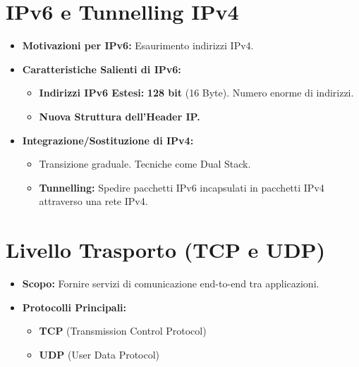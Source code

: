 \section{IPv6 e Tunnelling IPv4}
\begin{itemize}
    \item \textbf{Motivazioni per IPv6:} Esaurimento indirizzi IPv4.
    \item \textbf{Caratteristiche Salienti di IPv6:}
    \begin{itemize}
        \item \textbf{Indirizzi IPv6 Estesi:} \textbf{128 bit} (16 Byte). Numero enorme di indirizzi.
        \item \textbf{Nuova Struttura dell'Header IP.}
    \end{itemize}
    \item \textbf{Integrazione/Sostituzione di IPv4:}
    \begin{itemize}
        \item Transizione graduale. Tecniche come Dual Stack.
        \item \textbf{Tunnelling:} Spedire pacchetti IPv6 incapsulati in pacchetti IPv4 attraverso una rete IPv4.
    \end{itemize}
\end{itemize}

\section{Livello Trasporto (TCP e UDP)}
\begin{itemize}
    \item \textbf{Scopo:} Fornire servizi di comunicazione end-to-end tra applicazioni.
    \item \textbf{Protocolli Principali:}
    \begin{itemize}
        \item \textbf{TCP} (Transmission Control Protocol)
        \item \textbf{UDP} (User Data Protocol)
    \end{itemize}
\end{itemize}

